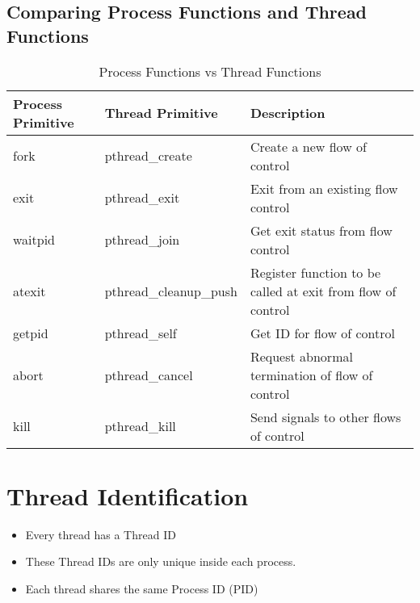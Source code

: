 \documentclass{article}
\begin{document}
\subsection{Comparing Process Functions and Thread Functions}
\begin{table}[h!]
        \caption{Process Functions vs Thread Functions}
        \vspace{1.5mm}
    \begin{center}
        \begin{tabular}{|l|l|l|}
            \hline
            \textbf{Process Primitive} & \textbf{Thread Primitive} & \textbf{Description} \\
            \hline
            fork & pthread\_create  & Create a new flow of control \\
            \hline
            exit & pthread\_exit & Exit from an existing flow control \\
            \hline
            waitpid & pthread\_join & Get exit status from flow control \\
            \hline
            atexit & pthread\_cleanup\_push & Register function to be called at exit from flow of control \\
            \hline
            getpid & pthread\_self & Get ID for flow of control \\
            \hline
            abort & pthread\_cancel & Request abnormal termination of flow of control \\
            \hline
            kill & pthread\_kill & Send signals to other flows of control \\
            \hline
        \end{tabular}
    \end{center}
\end{table}

\section{Thread Identification}
\begin{itemize}
    \item Every thread has a Thread ID
    \item These Thread IDs are only unique inside each process.
    \item Each thread shares the same Process ID (PID)
\end{itemize}
\end{document}
